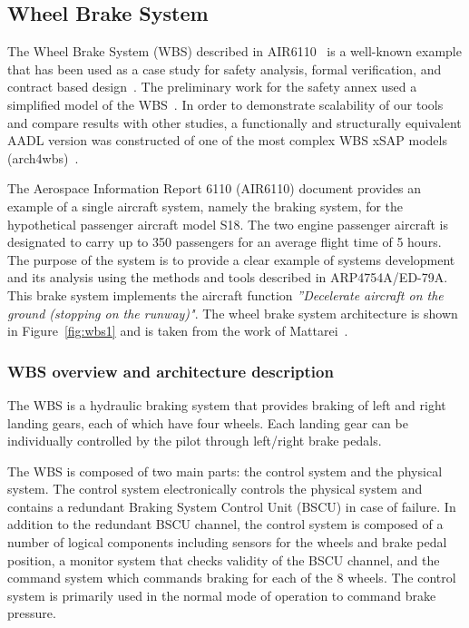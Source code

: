 \subsection{Wheel Brake System}
The Wheel Brake System (WBS) described in AIR6110~\cite{AIR6110} is a well-known example that has been used as a case study for safety analysis, formal verification, and contract based design~\cite{DBLP:conf/cav/BozzanoCPJKPRT15, 10.1007/978-3-319-11936-6-7, CAV2015:BoCiGrMa, Joshi05:SafeComp, mattarei}. The preliminary work for the safety annex used a simplified model of the WBS~\cite{Stewart17:IMBSA}. In order to demonstrate scalability of our tools and compare results with other studies, a functionally and structurally equivalent AADL version was constructed of one of the most complex WBS xSAP models (arch4wbs)~\cite{DBLP:conf/cav/BozzanoCPJKPRT15}. 

The Aerospace Information Report 6110 (AIR6110) document provides an example of a single aircraft system, namely the braking system, for the hypothetical passenger aircraft model S18. The two engine passenger aircraft is designated to carry up to 350 passengers for an average flight time of 5 hours. The purpose of the system is to provide a clear example of systems development and its analysis using the methods and tools described in ARP4754A/ED-79A. This brake system implements the aircraft function \textit{''Decelerate aircraft on the ground (stopping on the runway)"}. The wheel brake system architecture is shown in Figure~\ref{fig:wbs1} and is taken from the work of Mattarei~\cite{mattarei}. 

\subsubsection{WBS overview and architecture description}
The WBS is a hydraulic braking system that provides braking of left and right landing gears, each of which have four wheels. Each landing gear can be individually controlled by the pilot through left/right brake pedals. 

The WBS is composed of two main parts: the control system and the physical system. The control system electronically controls the physical system and contains a redundant Braking System Control Unit (BSCU) in case of failure. In addition to the redundant BSCU channel, the control system is composed of a number of logical components including sensors for the wheels and brake pedal position, a monitor system that checks validity of the BSCU channel, and the command system which commands braking for each of the 8 wheels. The control system is primarily used in the normal mode of operation to command brake pressure.  

